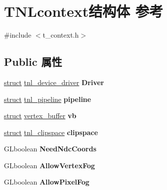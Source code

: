 \hypertarget{struct_t_n_lcontext}{}\section{T\+N\+Lcontext结构体 参考}
\label{struct_t_n_lcontext}


{\ttfamily \#include $<$t\+\_\+context.\+h$>$}

\subsection*{Public 属性}
\begin{DoxyCompactItemize}
\item 
\mbox{\label{struct_t_n_lcontext_a50478bb1d252b77175154056199cbf1b}} 
\hyperlink{interfacestruct}{struct} \hyperlink{structtnl__device__driver}{tnl\+\_\+device\+\_\+driver} {\bfseries Driver}
\item 
\mbox{\label{struct_t_n_lcontext_a9f3adf3744d74c673b12675b47a64ae2}} 
\hyperlink{interfacestruct}{struct} \hyperlink{structtnl__pipeline}{tnl\+\_\+pipeline} {\bfseries pipeline}
\item 
\mbox{\label{struct_t_n_lcontext_af745b4d2ff1e22df59b92bc69a059b2f}} 
\hyperlink{interfacestruct}{struct} \hyperlink{structvertex__buffer}{vertex\+\_\+buffer} {\bfseries vb}
\item 
\mbox{\label{struct_t_n_lcontext_a375c74edce530a9d05abfe8f76df88ad}} 
\hyperlink{interfacestruct}{struct} \hyperlink{structtnl__clipspace}{tnl\+\_\+clipspace} {\bfseries clipspace}
\item 
\mbox{\label{struct_t_n_lcontext_aa60f40d584d15d6198aefe0056d3a3e4}} 
G\+Lboolean {\bfseries Need\+Ndc\+Coords}
\item 
\mbox{\label{struct_t_n_lcontext_a205beae0ef984d6261ca7f2ecd5f7bf2}} 
G\+Lboolean {\bfseries Allow\+Vertex\+Fog}
\item 
\mbox{\label{struct_t_n_lcontext_a8330ac2a53c7107d2f6aef97d6d0a2c3}} 
G\+Lboolean {\bfseries Allow\+Pixel\+Fog}
\item 
\mbox{\label{struct_t_n_lcontext_a1429441d1e9c46636d541fc1b786759d}} 

\end{DoxyCompactItemize}
